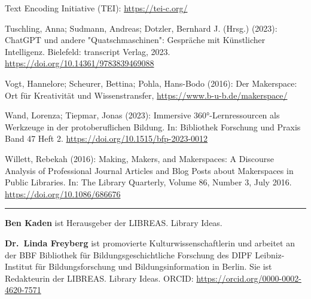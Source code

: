 \documentclass[a4paper,
fontsize=11pt,
oneside,
numbers=noperiodatend,
parskip=half-,
bibliography=totoc,
final
]{scrartcl}
\begin{document}
Text Encoding Initiative (TEI): \url{https://tei-c.org/}

Tuschling, Anna; Sudmann, Andreas; Dotzler, Bernhard J. (Hrsg.) (2023):
Chat\-GPT und andere "Quatschmaschinen": Gespräche mit Künstlicher
Intelligenz. Bielefeld: transcript Verlag, 2023.
\url{https://doi.org/10.14361/9783839469088}

Vogt, Hannelore; Scheurer, Bettina; Pohla, Hans-Bodo (2016): Der
Makerspace: Ort für Kreativität und Wissenstransfer,
\url{https://www.b-u-b.de/makerspace/}

Wand, Lorenza; Tiepmar, Jonas (2023): Immersive 360°-Lernressourcen als
Werkzeuge in der protoberuflichen Bildung. In: Bibliothek Forschung und
Praxis Band 47 Heft 2. \url{https://doi.org/10.1515/bfp-2023-0012}

Willett, Rebekah (2016): Making, Makers, and Makerspaces: A Discourse
Analysis of Professional Journal Articles and Blog Posts about
Makerspaces in Public Libraries. In: The Library Quarterly, Volume 86,
Number 3, July 2016. \url{https://doi.org/10.1086/686676}

\begin{center}\rule{0.5\linewidth}{0.5pt}\end{center}

\textbf{Ben Kaden} ist Herausgeber der LIBREAS. Library Ideas.

\textbf{Dr.~Linda Freyberg} ist promovierte Kulturwissenschaftlerin und
arbeitet an der BBF \textbar{} Bibliothek für Bildungsgeschichtliche
Forschung des DIPF \textbar{} Leibniz-Institut für Bildungsforschung und
Bildungsinformation in Berlin. Sie ist Redakteurin der LIBREAS. Library
Ideas. ORCID: \url{https://orcid.org/0000-0002-4620-7571}
\end{document}
